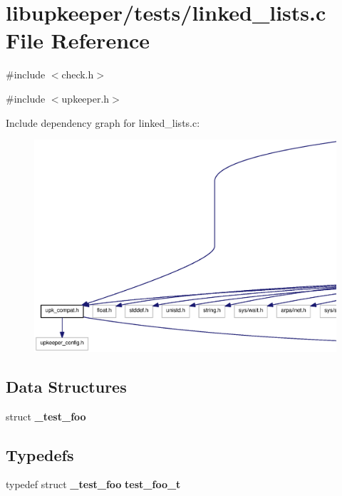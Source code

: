 \section{libupkeeper/tests/linked\_\-lists.c File Reference}
\label{linked__lists_8c}
{\ttfamily \#include $<$check.h$>$}\par
{\ttfamily \#include $<$upkeeper.h$>$}\par
Include dependency graph for linked\_\-lists.c:
\nopagebreak
\begin{figure}[H]
\begin{center}
\leavevmode
\includegraphics[width=400pt]{linked__lists_8c__incl}
\end{center}
\end{figure}
\subsection*{Data Structures}
\begin{DoxyCompactItemize}
\item 
struct {\bf \_\-test\_\-foo}
\end{DoxyCompactItemize}
\subsection*{Typedefs}
\begin{DoxyCompactItemize}
\item 
typedef struct {\bf \_\-test\_\-foo} {\bf test\_\-foo\_\-t}
\end{DoxyCompactItemize}
